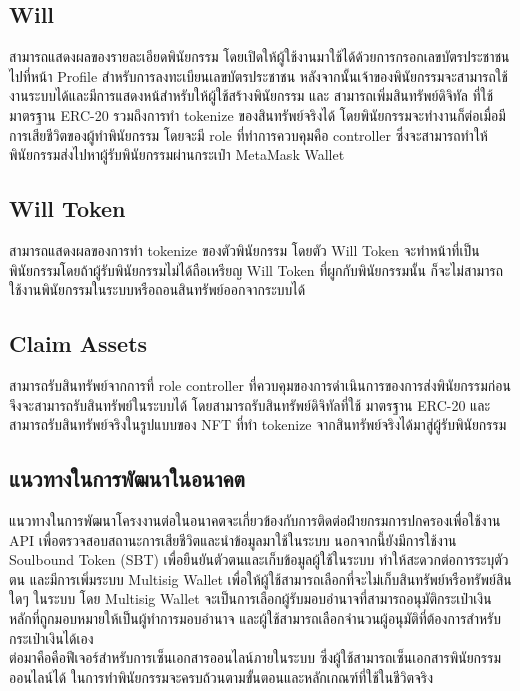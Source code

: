 \documentclass[12pt,oneside,openright,a4paper]{cpe-thai-project}
\begin{document}
\subsection{Will}
\tab สามารถแสดงผลของรายละเอียดพินัยกรรม โดยเปิดให้ผู้ใช้งานมาใช้ได้ด้วยการกรอกเลขบัตรประชาชนไปที่หน้า Profile สำหรับการลงทะเบียนเลขบัตรประชาชน หลังจากนั้นเจ้าของพินัยกรรมจะสามารถใช้งานระบบได้และมีการแสดงหน้สำหรับให้ผู้ใช้สร้างพินัยกรรม และ สามารถเพิ่มสินทรัพย์ดิจิทัล ที่ใช้มาตรฐาน ERC-20 รวมถึงการทำ tokenize ของสินทรัพย์จริงได้ โดยพินัยกรรมจะทำงานก็ต่อเมื่อมีการเสียชีวิตของผู้ทำพินัยกรรม โดยจะมี role ที่ทำการควบคุมคือ controller ซึ่งจะสามารถทำให้พินัยกรรมส่งไปหาผู้รับพินัยกรรมผ่านกระเป๋า MetaMask Wallet

\subsection{Will Token}
\tab สามารถแสดงผลของการทำ tokenize ของตัวพินัยกรรม โดยตัว Will Token จะทำหน้าที่เป็นพินัยกรรมโดยถ้าผู้รับพินัยกรรมไม่ได้ถือเหรียญ Will Token ที่ผูกกับพินัยกรรมนั้น ก็จะไม่สามารถใช้งานพินัยกรรมในระบบหรือถอนสินทรัพย์ออกจากระบบได้
\subsection{Claim Assets}
\tab สามารถรับสินทรัพย์จากการที่ role controller ที่ควบคุมของการดำเนินการของการส่งพินัยกรรมก่อนจึงจะสามารถรับสินทรัพย์ในระบบได้ โดยสามารถรับสินทรัพย์ดิจิทัลที่ใช้ มาตรฐาน ERC-20 และ สามารถรับสินทรัพย์จริงในรูปแบบของ NFT ที่ทำ tokenize จากสินทรัพย์จริงได้มาสู่ผู้รับพินัยกรรม

\subsection{แนวทางในการพัฒนาในอนาคต}
\tab แนวทางในการพัฒนาโครงงานต่อในอนาคตจะเกี่ยวข้องกับการติดต่อฝ่ายกรมการปกครองเพื่อใช้งาน API เพื่อตรวจสอบสถานะการเสียชีวิตและนำข้อมูลมาใช้ในระบบ นอกจากนี้ยังมีการใช้งาน Soulbound Token (SBT) เพื่อยืนยันตัวตนและเก็บข้อมูลผู้ใช้ในระบบ ทำให้สะดวกต่อการระบุตัวตน และมีการเพิ่มระบบ Multisig Wallet เพื่อให้ผู้ใช้สามารถเลือกที่จะไม่เก็บสินทรัพย์หรือทรัพย์สินใดๆ ในระบบ โดย Multisig Wallet จะเป็นการเลือกผู้รับมอบอำนาจที่สามารถอนุมัติกระเป๋าเงินหลักที่ถูกมอบหมายให้เป็นผู้ทำการมอบอำนาจ และผู้ใช้สามารถเลือกจำนวนผู้อนุมัติที่ต้องการสำหรับกระเป๋าเงินได้เอง\\
\tab ต่อมาคือคือฟีเจอร์สำหรับการเซ็นเอกสารออนไลน์ภายในระบบ ซึ่งผู้ใช้สามารถเซ็นเอกสารพินัยกรรมออนไลน์ได้ ในการทำพินัยกรรมจะครบถ้วนตามขั้นตอนและหลักเกณฑ์ที่ใช้ในชีวิตจริง
\end{document}
